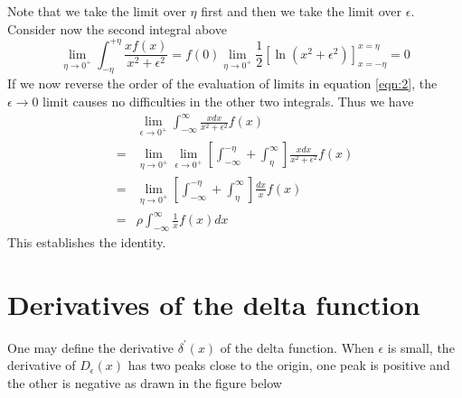 \begin{enumerate}[label=\textbf{Note : \ \arabic*},start=1]
			Note that we take the limit over $\eta$ first and then we take the limit over $\epsilon$. Consider now the second integral above
			\begin{equation} 
				\lim\limits_{\eta \rightarrow 0^+} \int_{-\eta}^{+\eta} \frac{x f(x)}{x^2 + \epsilon^2} = f(0) \lim\limits_{\eta \rightarrow 0^+} \frac{1}{2}  \left[\ln({x^2 + \epsilon^2}
				)\right]_{x=-\eta}^{x=\eta} = 0
			\end{equation}
			If we now reverse the order of the evaluation of limits in equation \ref{eqn:2}, the $\epsilon \rightarrow 0$ limit causes no difficulties in the other two integrals.
			Thus we have
			\begin{eqnarray}
				&\lim\limits_{\epsilon \rightarrow 0^+} \int_{-\infty}^{\infty} \frac{x dx}{x^2 + \epsilon^2} f(x)\nonumber \\
				 = &\lim\limits_{\eta \rightarrow 0^+} \lim\limits_{\epsilon \rightarrow 0^+} \left[\int_{-\infty}^{-\eta} + \int_{\eta}^{\infty}\right] \frac{x dx}{x^2 + \epsilon^2} f(x) \nonumber \\
				 = &\lim\limits_{\eta \rightarrow 0^+} \left[\int_{-\infty}^{-\eta} + \int_{\eta}^{\infty}\right] \frac{dx}{x} f(x) \nonumber\\
				 = & \rho \int_{-\infty}^{\infty} \frac{1}{x} f(x) dx \nonumber
			\end{eqnarray}
			This establishes the identity.
		\end{enumerate}
		
	\section{Derivatives of the delta function}
		One may define the derivative $\delta^\prime(x)$ of the delta function. When $\epsilon$ is small, the derivative of $D_\epsilon(x)$ has two peaks close to the origin, one peak is positive and the other is negative as drawn in the figure below
		
		
		

